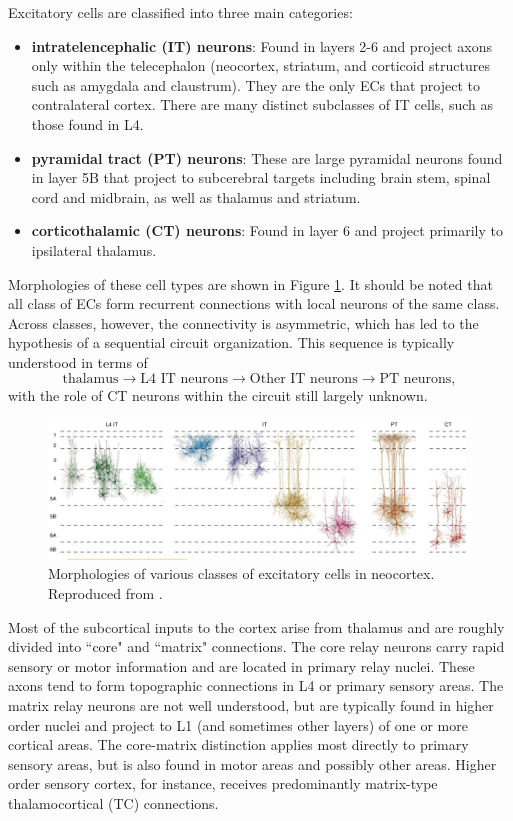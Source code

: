 Excitatory cells are classified into three main categories:
\begin{itemize}
	\item \textbf{intratelencephalic (IT) neurons}: Found in layers 2-6 and project axons only within the telecephalon (neocortex, striatum, and corticoid structures such as amygdala and claustrum). They are the only ECs that project to contralateral cortex. There are many distinct subclasses of IT cells, such as those found in L4.
	\item \textbf{pyramidal tract (PT) neurons}: These are large pyramidal neurons found in layer 5B that project to subcerebral targets including brain stem, spinal cord and midbrain, as well as thalamus and striatum. 
	\item \textbf{corticothalamic (CT) neurons}: Found in layer 6 and project primarily to ipsilateral thalamus.
\end{itemize}
Morphologies of these cell types are shown in Figure \ref{fig: cortical morphologies}. It should be noted that all class of ECs form recurrent connections with local neurons of the same class. Across classes, however, the connectivity is asymmetric, which has led to the hypothesis of a sequential circuit organization. This sequence is typically understood in terms of
$$ \text{thalamus} \rightarrow \text{L4 IT neurons} \rightarrow \text{Other IT neurons} \rightarrow \text{PT neurons},$$
with the role of CT neurons within the circuit still largely unknown. 

\begin{figure}[h]
    \centering
    \includegraphics[width=\textwidth]{images/neuroscience/cortical_morphologies.png}
    \caption{Morphologies of various classes of excitatory cells in neocortex. Reproduced from \cite{harris2015neocortical}.}
    \label{fig: cortical morphologies}
\end{figure}

Most of the subcortical inputs to the cortex arise from thalamus and are roughly divided into ``core" and ``matrix" connections. The core relay neurons carry rapid sensory or motor information and are located in primary relay nuclei. These axons tend to form topographic connections in L4 or primary sensory areas. The matrix relay neurons are not well understood, but are typically found in higher order nuclei and project to L1 (and sometimes other layers) of one or more cortical areas. The core-matrix distinction applies most directly to primary sensory areas, but is also found in motor areas and possibly other areas. Higher order sensory cortex, for instance, receives predominantly matrix-type thalamocortical (TC) connections. 


